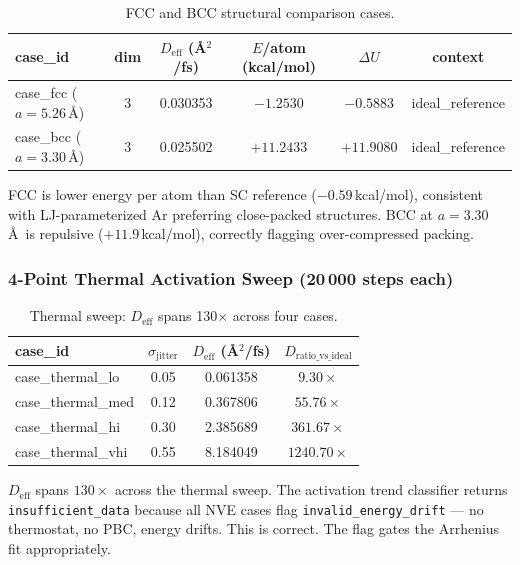 \documentclass[11pt,a4paper]{article}
\begin{document}
\begin{table}[h!]
\centering
\small
\begin{tabular}{lccccc}
\toprule
\textbf{case\_id} & \textbf{dim} & \textbf{$D_\text{eff}$ (\AA$^2$/fs)} & \textbf{$E$/atom (kcal/mol)} & \textbf{$\Delta U$} & \textbf{context} \\
\midrule
case\_fcc ($a=5.26$\,\AA) & 3 & 0.030353 & $-1.2530$ & $-0.5883$ & ideal\_reference \\
case\_bcc ($a=3.30$\,\AA) & 3 & 0.025502 & $+11.2433$ & $+11.9080$ & ideal\_reference \\
\bottomrule
\end{tabular}
\caption{FCC and BCC structural comparison cases.}
\end{table}

FCC is lower energy per atom than SC reference ($-0.59$\,kcal/mol), consistent with
LJ-parameterized Ar preferring close-packed structures. BCC at $a=3.30$\,\AA\ is repulsive
($+11.9$\,kcal/mol), correctly flagging over-compressed packing.

\subsubsection{4-Point Thermal Activation Sweep (20\,000 steps each)}

\begin{table}[h!]
\centering
\begin{tabular}{lccc}
\toprule
\textbf{case\_id} & \textbf{$\sigma_\text{jitter}$} & \textbf{$D_\text{eff}$ (\AA$^2$/fs)} & \textbf{$D_\text{ratio\_vs\_ideal}$} \\
\midrule
case\_thermal\_lo  & 0.05 & 0.061358  & $9.30\times$    \\
case\_thermal\_med & 0.12 & 0.367806  & $55.76\times$   \\
case\_thermal\_hi  & 0.30 & 2.385689  & $361.67\times$  \\
case\_thermal\_vhi & 0.55 & 8.184049  & $1240.70\times$ \\
\bottomrule
\end{tabular}
\caption{Thermal sweep: $D_\text{eff}$ spans 130$\times$ across four cases.}
\end{table}

$D_\text{eff}$ spans $130\times$ across the thermal sweep. The activation trend classifier
returns \texttt{insufficient\_data} because all NVE cases flag \texttt{invalid\_energy\_drift}
--- no thermostat, no PBC, energy drifts. This is correct. The flag gates the Arrhenius fit
appropriately.
\end{document}
